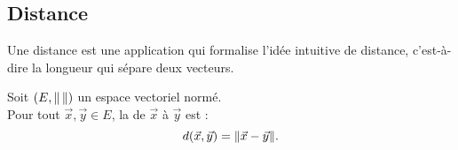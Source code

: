 \documentclass{book}
\begin{document}
\subsection{Distance}
\begin{minipage}[c]{0.6\linewidth}{
Une distance est une application qui formalise l'idée intuitive de distance, c'est-à-dire la longueur qui sépare deux vecteurs.}
\end{minipage}
    \begin{minipage}[c]{0.4\linewidth}{
}
    \end{minipage}
\begin{Definition}
Soit $(E,\mathopen\lVert \, \mathclose\rVert)$ un espace vectoriel normé.\\
Pour tout $\vec{x},\vec{y}\in E$, la  de $\vec{x}$ à $\vec{y}$ est : 
$$d(\vec{x},\vec{y}) = \mathopen\lVert \vec{x}-\vec{y} \mathclose\rVert.$$
\end{Definition}
\end{document}
